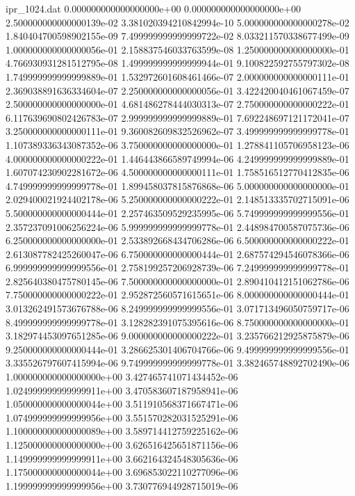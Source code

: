 \usetikzlibrary{pgfplots.groupplots}

\begin{filecontents}{ipr_1024.dat}
0.000000000000000000e+00 0.000000000000000000e+00
2.500000000000000139e-02 3.381020394210842994e-10
5.000000000000000278e-02 1.840404700598902155e-09
7.499999999999999722e-02 8.033211570338677499e-09
1.000000000000000056e-01 2.158837546033763599e-08
1.250000000000000000e-01 4.766930931281512795e-08
1.499999999999999944e-01 9.100822592755797302e-08
1.749999999999999889e-01 1.532972601608461466e-07
2.000000000000000111e-01 2.369038891636334604e-07
2.250000000000000056e-01 3.422420040461067459e-07
2.500000000000000000e-01 4.681486278444030313e-07
2.750000000000000222e-01 6.117639690802426783e-07
2.999999999999999889e-01 7.692248697121172041e-07
3.250000000000000111e-01 9.360082609832526962e-07
3.499999999999999778e-01 1.107389336343087352e-06
3.750000000000000000e-01 1.278841105706958123e-06
4.000000000000000222e-01 1.446443866589749994e-06
4.249999999999999889e-01 1.607074230902281672e-06
4.500000000000000111e-01 1.758516512770412835e-06
4.749999999999999778e-01 1.899458037815876868e-06
5.000000000000000000e-01 2.029400021924402178e-06
5.250000000000000222e-01 2.148513335702715091e-06
5.500000000000000444e-01 2.257463509529235995e-06
5.749999999999999556e-01 2.357237091006256224e-06
5.999999999999999778e-01 2.448984700587075736e-06
6.250000000000000000e-01 2.533892668434706286e-06
6.500000000000000222e-01 2.613087782425260047e-06
6.750000000000000444e-01 2.687574294546078366e-06
6.999999999999999556e-01 2.758199257206928739e-06
7.249999999999999778e-01 2.825640380475780145e-06
7.500000000000000000e-01 2.890410412151062786e-06
7.750000000000000222e-01 2.952872560571615651e-06
8.000000000000000444e-01 3.013262491573676788e-06
8.249999999999999556e-01 3.071713496050759717e-06
8.499999999999999778e-01 3.128282391075395616e-06
8.750000000000000000e-01 3.182974453097651285e-06
9.000000000000000222e-01 3.235766212925875879e-06
9.250000000000000444e-01 3.286625301406704766e-06
9.499999999999999556e-01 3.335526797607415994e-06
9.749999999999999778e-01 3.382465748892702490e-06
1.000000000000000000e+00 3.427465741071434452e-06
1.024999999999999911e+00 3.470583607187958941e-06
1.050000000000000044e+00 3.511910568371667471e-06
1.074999999999999956e+00 3.551570282031525291e-06
1.100000000000000089e+00 3.589714412759225162e-06
1.125000000000000000e+00 3.626516425651871156e-06
1.149999999999999911e+00 3.662164324548305636e-06
1.175000000000000044e+00 3.696853022110277096e-06
1.199999999999999956e+00 3.730776944928715019e-06

\end{filecontents}
